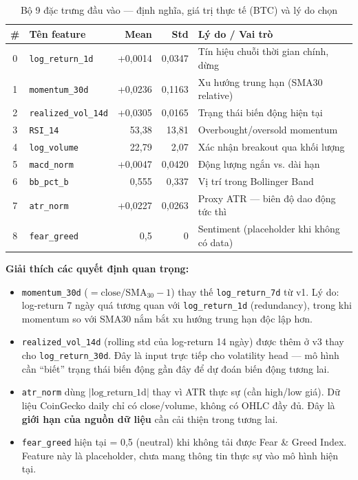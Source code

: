 \documentclass[12pt, a4paper]{report}
\begin{document}
\begin{table}[H]
  \centering
  \caption{Bộ 9 đặc trưng đầu vào --- định nghĩa, giá trị thực tế (BTC) và lý do chọn}
  \label{tab:features}
  \begin{tabular}{clrrl}
    \toprule
    \# & Tên feature & Mean & Std & Lý do / Vai trò \\
    \midrule
    0 & \texttt{log\_return\_1d}    & +0,0014 & 0,0347 & Tín hiệu chuỗi thời gian chính, dừng \\
    1 & \texttt{momentum\_30d}      & +0,0236 & 0,1163 & Xu hướng trung hạn (SMA30 relative) \\
    2 & \texttt{realized\_vol\_14d} & +0,0305 & 0,0165 & Trạng thái biến động hiện tại \\
    3 & \texttt{RSI\_14}            & 53,38  & 13,81  & Overbought/oversold momentum \\
    4 & \texttt{log\_volume}        & 22,79  & 2,07   & Xác nhận breakout qua khối lượng \\
    5 & \texttt{macd\_norm}         & +0,0047 & 0,0420 & Động lượng ngắn vs. dài hạn \\
    6 & \texttt{bb\_pct\_b}         & 0,555  & 0,337  & Vị trí trong Bollinger Band \\
    7 & \texttt{atr\_norm}          & +0,0227 & 0,0263 & Proxy ATR --- biên độ dao động tức thì \\
    8 & \texttt{fear\_greed}        & 0,5    & 0      & Sentiment (placeholder khi không có data) \\
    \bottomrule
  \end{tabular}
\end{table}

\textbf{Giải thích các quyết định quan trọng:}

\begin{itemize}
  \item \texttt{momentum\_30d} ($= \text{close}/\text{SMA}_{30} - 1$) thay thế
    \texttt{log\_return\_7d} từ v1. Lý do: log-return 7 ngày quá tương quan với
    \texttt{log\_return\_1d} (redundancy), trong khi momentum so với SMA30 nắm bắt xu
    hướng trung hạn độc lập hơn.

  \item \texttt{realized\_vol\_14d} (rolling std của log-return 14 ngày) được thêm ở v3
    thay cho \texttt{log\_return\_30d}. Đây là input trực tiếp cho volatility head --- mô
    hình cần ``biết'' trạng thái biến động gần đây để dự đoán biến động tương lai.

  \item \texttt{atr\_norm} dùng $|\text{log\_return\_1d}|$ thay vì ATR thực sự (cần
    high/low giá). Dữ liệu CoinGecko daily chỉ có close/volume, không có OHLC đầy đủ.
    Đây là \textbf{giới hạn của nguồn dữ liệu} cần cải thiện trong tương lai.

  \item \texttt{fear\_greed} hiện tại = 0,5 (neutral) khi không tải được Fear \& Greed
    Index. Feature này là placeholder, chưa mang thông tin thực sự vào mô hình hiện tại.
\end{itemize}
\end{document}
